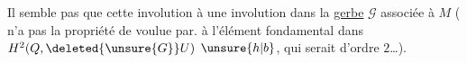 Il  semble pas que cette involution  à une involution dans la \uline{gerbe} $\mathcal G$ associée à $M$ (   n'a pas la propriété de  voulue par. à l'élément fondamental  dans $H^2(Q,\deleted{\unsure{G}}U)$ $\unsure{h|b}$, qui serait  d'ordre  $2$\ldots).

